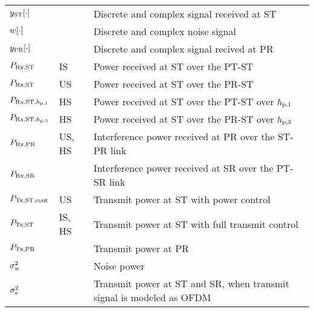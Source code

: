 \begin{longtable}{p{}p{}p{}}
	$y_{\text{ST}}[\cdot]$       & &             Discrete and complex signal received at ST \\	
	
	$w[\cdot]$       & &             Discrete and complex noise signal \\	

	$y_{\text{PR}}[\cdot]$       & &             Discrete and complex signal recived at PR \\	
	$P_{\text{Rx,ST}}$  		& IS &		Power received at ST over the PT-ST \\ 
	$P_{\text{Rx,ST}}$  		& US &		Power received at ST over the PR-ST \\ 
	$P_{\text{Rx,ST,$h_{\text{p,1}}$}}$  		& HS &		Power received at ST over the PT-ST over $h_{\text{p,1}}$ \\ 
	$P_{\text{Rx,ST,$h_{\text{p,3}}$}}$  		& HS &		Power received at ST over the PR-ST over $h_{\text{p,3}}$ \\ 
	$P_{\text{Rx,PR}}$  		& US, HS &		Interference power received at PR over the ST-PR link \\
	$P_{\text{Rx,SR}}$  		& &		Interference power received at SR over the PT-SR link\\ 

	$P_{\text{Tx,ST,cont}}$	  		& US &  	Transmit power at ST with power control \\
	$P_{\text{Tx,ST}}$ 		& IS, HS&  	Transmit power at ST with full transmit control \\
	$P_{\text{Tx,PR}}$  		& &		Transmit power at PR \\

	$\sigma^2_{\text{w}}$	 		& & 	Noise power \\
	$\sigma^2_{\text{s}}$	 		& &  Transmit power at ST and SR, when transmit signal is modeled as OFDM  \\


\end{longtable}
